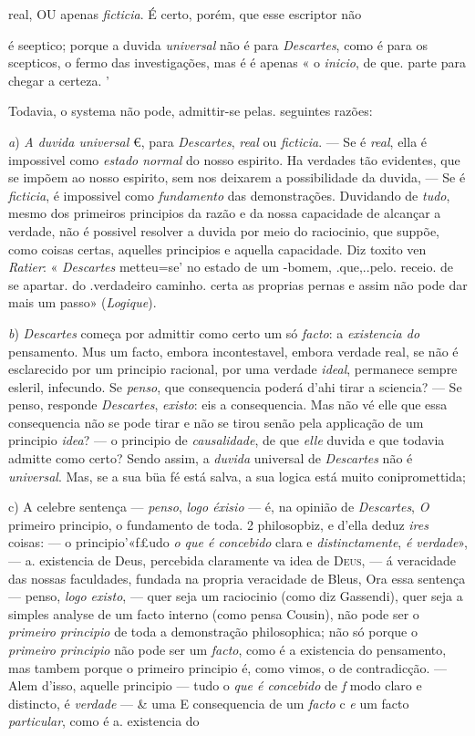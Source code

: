 real, OU apenas \emph{ficticia}. É certo, porém, que esse escriptor não\par é seeptico; porque a duvida \emph{universal} não é \textbar{} para \emph{Descartes}, como é para os scepticos, o fermo das investigações, mas é é apenas « o \emph{inicio}, de que. parte para chegar a certeza. '\par Todavia, o systema não pode, admittir-se pelas. seguintes razões:\par \emph{a}) \emph{A duvida universal} €, para \emph{Descartes}, \emph{real} ou \emph{ficticia}. --- Se é \emph{real}, ella é impossivel como \emph{estado normal} do nosso espirito. Ha verdades tão evidentes, que se impõem ao nosso espirito, sem nos deixarem a possibilidade da duvida, --- Se é \emph{ficticia}, é impossivel como \emph{fundamento} das demonstrações. Duvidando de \emph{tudo}, mesmo dos primeiros principios da razão e da nossa capacidade de alcançar a verdade, não é possivel resolver a duvida por meio do raciocinio, que suppõe, como coisas certas, aquelles principios e aquella capacidade. Diz toxito ven \emph{Ratier}: « \emph{Descartes} metteu=se' no estado de um -bomem, .que,..pelo. receio. de se apartar. do .verdadeiro caminho. certa as proprias pernas e assim não pode dar mais um passo» (\emph{Logique}).\par \emph{b}) \emph{Descartes} começa por admittir como certo um só \emph{facto}: a \emph{existencia do} pensamento. Mus um facto, embora incontestavel, embora verdade real, se não é esclarecido por um principio racional, por uma verdade \emph{ideal}, permanece sempre esleril, infecundo. Se \emph{penso}, que consequencia poderá d'ahi tirar a sciencia? --- Se penso, responde \emph{Descartes}, \emph{existo}: eis a consequencia. Mas não vé elle que essa consequencia não se pode tirar e não se tirou senão pela applicação de um principio \emph{idea}? --- o principio de \emph{causalidade}, de que \emph{elle} duvida e que todavia admitte como certo? Sendo assim, a \emph{duvida} universal de \emph{Descartes} não é \emph{universal}. Mas, se a sua büa fé está salva, a sua logica está muito conipromettida;\par c) A celebre sentença --- \emph{penso}, \emph{logo éxisio} --- é, na opinião de \emph{Descartes}, \emph{O} primeiro principio, o fundamento de toda. 2 philosopbiz, e d'ella deduz \emph{ires} coisas: --- o principio'«f£udo \emph{o que é concebido} clara e \emph{distinctamente}, \emph{é verdade}», --- a. existencia de Deus, percebida claramente va idea de \textsc{Deus}, --- á veracidade das nossas faculdades, fundada na propria veracidade de Bleus, Ora essa sentença --- penso, \emph{logo existo}, --- quer seja um raciocinio (como diz Gassendi), quer seja a simples analyse de um facto interno (como pensa Cousin), não pode ser o \emph{primeiro principio} de toda a demonstração philosophica; não só porque o \emph{primeiro principio} não pode ser um \emph{facto}, como é a existencia do pensamento, mas tambem porque o primeiro principio é, como vimos, o de contradicção. --- Alem d'isso, aquelle principio --- tudo o \emph{que é concebido} de \emph{f} modo claro e distincto, é \emph{verdade} --- \& uma E consequencia de um \emph{facto} c \emph{e} um facto \emph{particular}, como é a. existencia do 